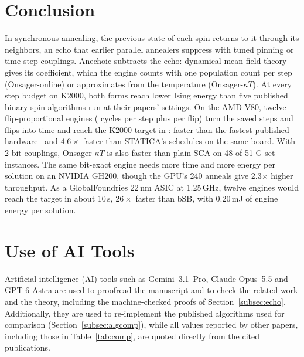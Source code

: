 \section{Conclusion}
In synchronous annealing, the previous state of each spin returns to it through its neighbors, an echo that earlier parallel annealers suppress with tuned pinning or time-step couplings. Anechoic subtracts the echo: dynamical mean-field theory gives its coefficient, which the engine counts with one population count per step (Onsager-online) or approximates from the temperature (Onsager-$\kappa T$). At every step budget on K2000, both forms reach lower Ising energy than five published binary-spin algorithms run at their papers' settings. On the AMD V80, twelve flip-proportional engines (\cycStep{} cycles per step plus \cycFlip{} per flip) turn the saved steps and flips into time and reach the K2000 target in \ttsPr{}: \spdBSB{} faster than the fastest published hardware~\cite{goto2021high} and $4.6\times$ faster than STATICA's schedules on the same board. With 2-bit couplings, Onsager-$\kappa T$ is also faster than plain SCA on 48 of 51 G-set instances. The same bit-exact engine needs \gpuSpd{} more time and \gpuEratio{} more energy per solution on an NVIDIA GH200, though the GPU's 240 anneals give 2.3$\times$ higher throughput. As a GlobalFoundries 22\,nm ASIC at 1.25\,GHz, twelve engines would reach the target in about 10\,\textmu s, $26\times$ faster than bSB, with 0.20\,mJ of engine energy per solution.

\section*{Use of AI Tools}\label{subsec:ai}
Artificial intelligence (AI) tools such as Gemini~3.1~Pro, Claude Opus~5.5 and GPT-6 Astra are used to proofread the manuscript and to check the related work and the theory, including the machine-checked proofs of Section~\ref{subsec:echo}. Additionally, they are used to re-implement the published algorithms used for comparison (Section~\ref{subsec:algcomp}), while all values reported by other papers, including those in Table~\ref{tab:comp}, are quoted directly from the cited publications.
